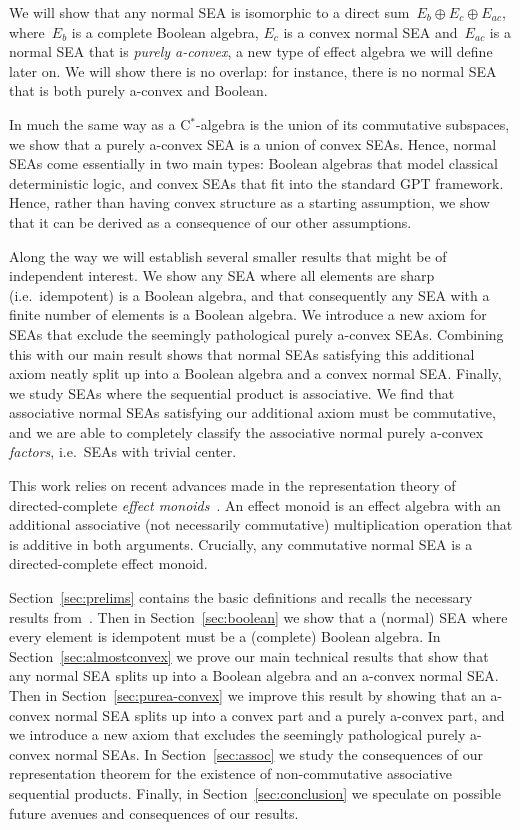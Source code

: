 \documentclass[a4paper, onecolumn, accepted=2020-12-22]{quantumarticle}
\theoremstyle{definition}
\begin{document}
We will show that any normal SEA
    is isomorphic to a direct sum~$E_b\oplus E_c \oplus E_{ac}$,
    where~$E_b$ is a complete Boolean algebra,
    $E_c$ is a convex normal SEA
    and~$E_{ac}$ is a normal SEA that is \emph{purely a-convex}, a new type of effect algebra we will define later on.
We will show there is no overlap:
    for instance, there is no normal SEA that is both purely a-convex and Boolean.

In much the same way as a C$^*$-algebra is the union of its commutative subspaces, we show that a purely a-convex SEA is a union of convex SEAs. Hence, normal SEAs come essentially in two main types: Boolean algebras that model classical deterministic logic, and convex SEAs that fit into the standard GPT framework.
Hence, rather than having convex structure as a starting assumption, we show that it can be derived as a consequence of our other assumptions.

Along the way we will establish several smaller results that might be of independent interest. 
We show any SEA where all elements are sharp (i.e.~idempotent) is a Boolean algebra, and that consequently any SEA with a finite number of elements is a Boolean algebra. 
We introduce a new axiom for SEAs that exclude the seemingly pathological purely a-convex SEAs. Combining this with our main result shows that normal SEAs satisfying this additional axiom neatly split up into a Boolean algebra and a convex normal SEA. 
Finally, we study SEAs where the sequential product is associative. 
We find that associative normal SEAs satisfying our additional axiom must be commutative, and we are able to completely classify the associative normal purely a-convex \emph{factors}, i.e.~SEAs with trivial center.  

This work relies on recent advances made in the representation theory
    of directed-complete \emph{effect monoids}~\cite{first}.
An effect monoid is an effect algebra with an additional
    associative (not necessarily commutative) multiplication
    operation that is additive in both arguments.
Crucially, any commutative normal SEA is a directed-complete
    effect monoid.

Section~\ref{sec:prelims} contains the basic definitions and recalls the necessary results from~\cite{first}.
Then in Section~\ref{sec:boolean} we show that a (normal) SEA where every element is idempotent must be a (complete) Boolean algebra.
In Section~\ref{sec:almostconvex} we prove our main technical results that show that any normal SEA splits up into a Boolean algebra and an a-convex normal SEA.
Then in Section~\ref{sec:purea-convex} we improve this result by showing that an a-convex normal SEA splits up into a convex part and a purely a-convex part, and we introduce a new axiom that excludes the seemingly pathological purely a-convex normal SEAs.
In Section~\ref{sec:assoc} we study the consequences of our representation theorem for the existence of non-commutative associative sequential products. 
Finally, in Section~\ref{sec:conclusion} we speculate on possible future avenues and consequences of our results.
\end{document}
